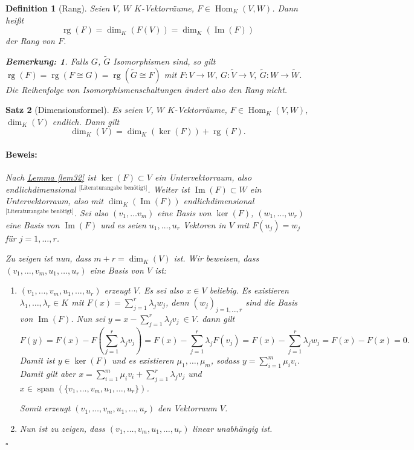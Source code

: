 \documentclass{report}
\newcommand{\lb}{\lambda}
\DeclareMathOperator{\Span}{span}
\DeclareMathOperator{\Hom}{Hom}
\DeclareMathOperator{\Ima}{Im}
\DeclareMathOperator{\rg}{rg}
\theoremstyle{customrem}
\newtheorem*{bem}{Bemerkung\textnormal:}
\theoremstyle{customdef}
\newtheorem{definition}{Definition}[chapter]
\newtheorem{satz}[definition]{Satz}
\renewenvironment{proof}{\vspace{-.75cm}\paragraph{Beweis: }}{\vspace{-.5cm}\hfill$\square$}
\begin{document}
	\begin{definition}[Rang]
		Seien $V$, $W$ $K$-Vektorräume, $F\in\Hom_K(V, W)$. Dann heißt $$\rg(F)=\dim_K(F(V)) = \dim_K(\Ima(F))$$ der Rang von $F$.\\
		\begin{bem}
			Falls $G$, $\tilde{G}$ Isomorphismen sind, so gilt $\rg(F) = \rg(F\cong G) = \rg(\tilde{G}\cong F)$ mit $F:V\to W,\ G:\tilde{V}\to V,\ \tilde{G}: W\to\tilde{W}$. Die Reihenfolge von Isomorphismenschaltungen ändert also den Rang nicht.\\
		\end{bem}
	\end{definition}
	
	\begin{satz}[Dimensionsformel]
		\label{satz37}
		Es seien $V$, $W$ $K$-Vektorräume, $F\in\Hom_K(V, W)$, $\dim_K(V)$ endlich. Dann gilt $$\dim_K(V) = \dim_K(\ker(F))+\rg(F).$$
		\begin{proof}
			Nach \hyperref[lem32]{Lemma \ref{lem32}} ist $\ker(F)\subset V$ ein Untervektorraum, also endlichdimensional ${}^\text{[Literaturangabe benötigt]}$. Weiter ist $\Ima(F)\subset W$ ein Untervektorraum, also mit $\dim_K(\Ima(F))$ endlichdimensional ${}^\text{[Literaturangabe benötigt]}$. Sei also $(v_1, \ldots v_m)$ eine Basis von $\ker(F)$, $(w_1,\ldots, w_r)$ eine Basis von $\Ima(F)$ und es seien $u_1,\ldots, u_r$ Vektoren in $V$ mit $F(u_j)=w_j$ für $j=1, \ldots, r$.
			
			Zu zeigen ist nun, dass $m+r=\dim_K(V)$ ist. Wir beweisen, dass $(v_1, \ldots, v_m, u_1, \ldots, u_r)$ eine Basis von $V$ ist:
			\begin{enumerate}
				\item $(v_1, \ldots, v_m, u_1, \ldots, u_r)$ erzeugt $V$. Es sei also $x\in V$ beliebig. Es existieren $\lb_1, \ldots, \lb_r\in K$ mit $F(x) = \sum_{j=1}^{r}\lb_j w_j$, denn $(w_j)_{j=1, \ldots, r}$ sind die Basis von $\Ima(F)$. Nun sei $y=x-\sum_{j=1}^{r}\lb_j v_j\ \in V$. dann gilt $$F(y) = F(x) - F\left(\sum_{j=1}^{r}\lb_j v_j\right) = F(x) - \sum_{j=1}^{r}\lb_j F(v_j)= F(x) - \sum_{j=1}^{r}\lb_j w_j = F(x)-F(x)=0.$$ Damit ist $y\in \ker(F)$ und es existieren $\mu_1, \ldots, \mu_m$, sodass $y=\sum_{i=1}^{m}\mu_i v_i$. Damit gilt aber $x=\sum_{i=1}^{m}\mu_iv_i + \sum_{j=1}^{r}\lb_jv_j$ und $x\in \Span(\{v_1, \ldots, v_m, u_1, \ldots, u_r\})$. 
				
				Somit erzeugt $(v_1, \ldots, v_m, u_1, \ldots, u_r)$ den Vektorraum $V$.
				
				\item Nun ist zu zeigen, dass $(v_1, \ldots, v_m, u_1, \ldots, u_r)$ linear unabhängig ist.
				

\end{enumerate}
\end{proof}
\end{satz}
\end{document}
